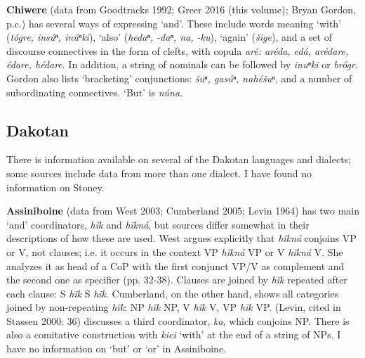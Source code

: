 \documentclass[output=paper]{LSP/langsci}
\begin{document}
\textbf{Chiwere} (data from Goodtracks 1992; Greer 2016 (this volume); Bryan Gordon, p.c.) has several ways of expressing `and'. These include words meaning `with' (\textit{t\'ogre, ins\'uⁿ, in\'uⁿki}), `also' (\textit{hedaⁿ, -daⁿ, na, -ku}), `again' (\textit{\v{s}ige}), and a set of discourse connectives in the form of clefts, with copula \textit{ar\'e: ar\'eda, ed\'a, ar\'edare, \'edare, h\'edare}. In addition, a string of nominals can be followed by \textit{inuⁿki} or \textit{br\'oge}. Gordon also lists `bracketing' conjunctions: \textit{\v{s}uⁿ, gas\'uⁿ, nah\'e\v{s}uⁿ}, and a number of subordinating connectives. `But' is \textit{n\'una}.

\subsection{Dakotan}
 
There is information available on several of the Dakotan languages and dialects; some sources include data from more than one dialect. I have found no information on Stoney.

\textbf{Assiniboine} (data from West 2003; Cumberland 2005; Levin 1964) has two main `and' coordinators, \textit{h\~ik} and \textit{h\~ikn\'a}, but sources differ somewhat in their descriptions of how these are used. West argues explicitly that \textit{h\~ikn\'a} conjoins VP or V, not clauses; i.e. it occurs in the context VP \textit{h\~ikn\'a} VP or V \textit{h\~ikn\'a} V. She analyzes it as head of a CoP with the first conjunct VP/V as complement and the second one as specifier (pp. 32-38). Clauses are joined by \textit{h\~ik} repeated after each clause: S \textit{h\~ik} S \textit{h\~ik}. Cumberland, on the other hand, shows all categories joined by non-repeating \textit{h\~ik}: NP \textit{h\~ik} NP, V \textit{h\~ik} V, VP \textit{h\~ik} VP. (Levin, cited in Stassen 2000: 36) discusses a third coordinator, \textit{ka}, which conjoins NP. There is also a comitative construction with \textit{kici} `with' at the end of a string of NPs. I have no information on `but' or `or' in Assiniboine.
\end{document}
